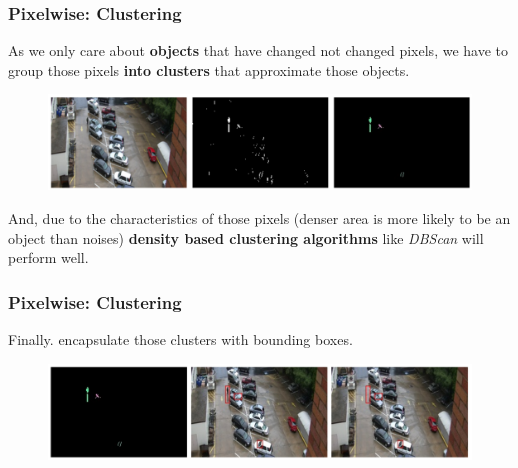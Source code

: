 \documentclass[13.5pt,aspecratio=169, xcolor=dvipsnames]{beamer}
\begin{document}

\begin{frame}
    \onehalfspacing
        \frametitle{Pixelwise: Clustering
        }
        \begin{block}{}
            As we only care about \textbf{objects} that have changed not changed pixels, we have to group those pixels \textbf{into clusters} that approximate those objects.
        \end{block}


            \begin{figure}
                \centering
                \includegraphics[width=\linewidth]{pixel_wise_clustering.png}
             \end{figure}


        And, due to the characteristics of those pixels (denser area is more likely to be an object than noises) \textbf{density based clustering algorithms} like \textit{DBScan} will perform well.
        
      
\end{frame}
    

\begin{frame}
    \onehalfspacing
        \frametitle{Pixelwise: Clustering
        }
        \begin{minipage}{0.8\textwidth}
        \begin{block}{}
            Finally. encapsulate those clusters with bounding boxes.
        \end{block}
    \end{minipage}

    \bigskip

            \begin{figure}
                \centering
                \includegraphics[width=\linewidth]{pixel_wise_clusters_with_bounding_boxes.png}
             \end{figure}
      
\end{frame}
    
\end{document}
